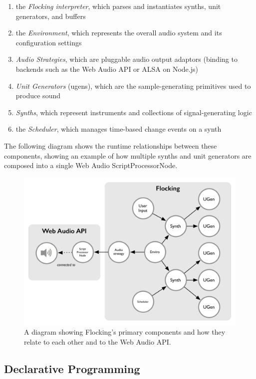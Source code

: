 \documentclass{article}
\begin{document}
\begin{enumerate}
\item the {\it Flocking interpreter}, which parses and instantiates synths, unit generators, and buffers
\item the {\it Environment}, which represents the overall audio system and its configuration settings
\item {\it Audio Strategies}, which are pluggable audio output adaptors (binding to backends such as the Web Audio API or ALSA on Node.js)
\item {\it Unit Generators} (ugens), which are the sample-generating primitives used to produce sound
\item {\it Synths}, which represent instruments and collections of signal-generating logic
\item the {\it Scheduler}, which manages time-based change events on a synth
\end{enumerate}

The following diagram shows the runtime relationships between these components, showing an example of how multiple synths and unit generators are composed into a single Web Audio ScriptProcessorNode.

\begin{figure}[h]
\centering
\includegraphics[width=0.9\columnwidth]{images/flocking-component-architecture.png}
\caption{ A diagram showing Flocking's primary components and how they relate to each other and to the Web Audio API.\label{fig:architecture}}
\end{figure}

\subsection{Declarative Programming}
\end{document}
